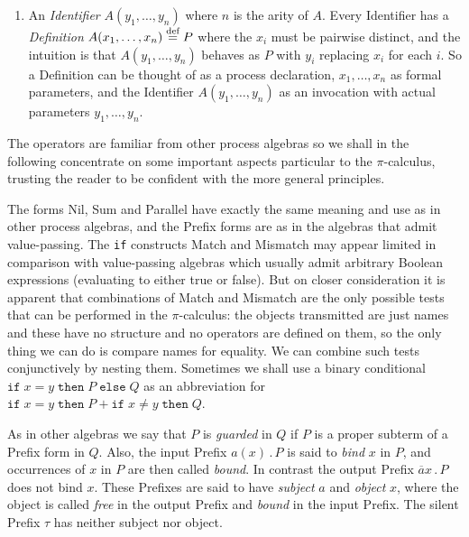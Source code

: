 \documentclass[10pt,a4paper]{article}
\newcommand{\ifthen}[2]{\texttt{if}\;#1\;\texttt{then}\;#2}
\newcommand{\ifthenelse}[3]{\ifthen{#1}{#2}\;\texttt{else}\;#3}
\newcommand{\outp}[2]{\overline{#1}#2}
\newcommand{\inpp}[2]{#1(#2)}
\newcommand{\silp}{\tau}
\newcommand{\prefix}[2]{{#1}\,.\,#2}
\newcommand{\out}[3]{\prefix{\outp{#1}{#2}}{#3}}
\newcommand{\inp}[3]{\prefix{\inpp{#1}{#2}}{#3}}
\newcommand{\defi}{\buildrel \text{def}\over =}
\begin{document}
\begin{enumerate}
\item An \emph{Identifier} $A(y_1,\dots,y_n)$ where $n$ is the arity of $A$. Every Identifier has a \emph{Definition} $A(x_1,\dots,x_n) \defi P$ where the $x_i$ must be pairwise distinct, and the intuition is that $A(y_1,\dots,y_n)$ behaves as $P$ with $y_i$ replacing $x_i$ for each $i$. So a Definition can be thought of as a process declaration, $x_1,\dots,x_n$ as formal parameters, and the Identifier $A(y_1,\dots,y_n)$ as an invocation with actual parameters $y_1,\dots,y_n$.

\end{enumerate}

The operators are familiar from other process algebras so we shall in the following concentrate on some important aspects particular to the $\pi$-calculus, trusting the reader to be confident with the more general principles.

The forms Nil, Sum and Parallel have exactly the same meaning and use as in other process algebras, and the Prefix forms are as in the algebras that admit value-passing. The \texttt{if} constructs Match and Mismatch may appear limited in comparison with value-passing algebras which usually admit arbitrary Boolean expressions (evaluating to either true or false). But on closer consideration it is apparent that combinations of Match and Mismatch are the only possible tests that can be performed in the $\pi$-calculus: the objects transmitted are just names and these have no structure and no operators are defined on them, so the only thing we can do is compare names for equality. We can combine such tests conjunctively by nesting them. Sometimes we shall use a binary conditional $\ifthenelse{x = y}{P}{Q}$ as an abbreviation for $\ifthen{x = y}{P} + \ifthen{x \neq y}{Q}$.

As in other algebras we say that $P$ is \emph{guarded} in $Q$ if $P$ is a proper subterm of a Prefix form in $Q$. Also, the input Prefix $\inp{a}{x}{P}$ is said to \emph{bind} $x$ in $P$, and occurrences of $x$ in $P$ are then called \emph{bound}. In contrast the output Prefix $\out{a}{x}{P}$ does not bind $x$. These Prefixes are said to have \emph{subject} $a$ and \emph{object} $x$, where the object is called \emph{free} in the output Prefix and \emph{bound} in the input Prefix. The silent Prefix $\silp$ has neither subject nor object.
\end{document}
